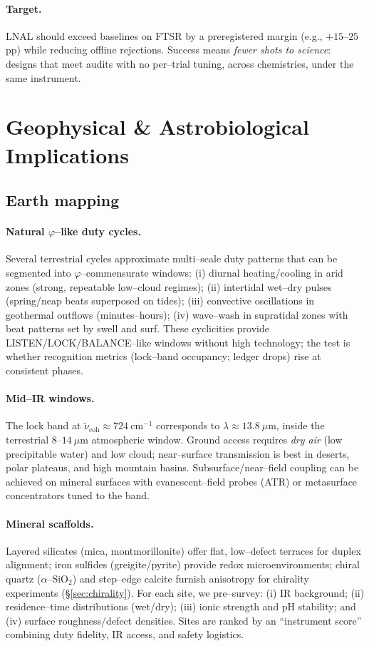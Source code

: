 \documentclass[11pt]{article}
\begin{document}
\paragraph{Target.}
LNAL should exceed baselines on FTSR by a preregistered margin (e.g., $+15$–$25$\,pp) while reducing offline rejections. Success means \emph{fewer shots to science}: designs that meet audits with no per–trial tuning, across chemistries, under the same instrument.

\section{Geophysical \& Astrobiological Implications}\label{sec:geo-astro}

\subsection{Earth mapping}\label{sec:earth-mapping}
\paragraph{Natural $\varphi$--like duty cycles.}
Several terrestrial cycles approximate multi–scale duty patterns that can be segmented into $\varphi$--commensurate windows: (i) diurnal heating/cooling in arid zones (strong, repeatable low–cloud regimes); (ii) intertidal wet–dry pulses (spring/neap beats superposed on tides); (iii) convective oscillations in geothermal outflows (minutes–hours); (iv) wave–wash in supratidal zones with beat patterns set by swell and surf. These cyclicities provide LISTEN/LOCK/BALANCE–like windows without high technology; the test is whether recognition metrics (lock–band occupancy; ledger drops) rise at consistent phases.

\paragraph{Mid–IR windows.}
The lock band at $\tilde\nu_{\mathrm{coh}}\approx724~\mathrm{cm^{-1}}$ corresponds to $\lambda\approx 13.8~\mu$m, inside the terrestrial $8$–$14~\mu$m atmospheric window. Ground access requires \emph{dry air} (low precipitable water) and low cloud; near–surface transmission is best in deserts, polar plateaus, and high mountain basins. Subsurface/near–field coupling can be achieved on mineral surfaces with evanescent–field probes (ATR) or metasurface concentrators tuned to the band.

\paragraph{Mineral scaffolds.}
Layered silicates (mica, montmorillonite) offer flat, low–defect terraces for duplex alignment; iron sulfides (greigite/pyrite) provide redox microenvironments; chiral quartz ($\alpha$–SiO$_2$) and step–edge calcite furnish anisotropy for chirality experiments (\S\ref{sec:chirality}). For each site, we pre–survey: (i) IR background; (ii) residence–time distributions (wet/dry); (iii) ionic strength and pH stability; and (iv) surface roughness/defect densities. Sites are ranked by an ``instrument score'' combining duty fidelity, IR access, and safety logistics.
\end{document}
